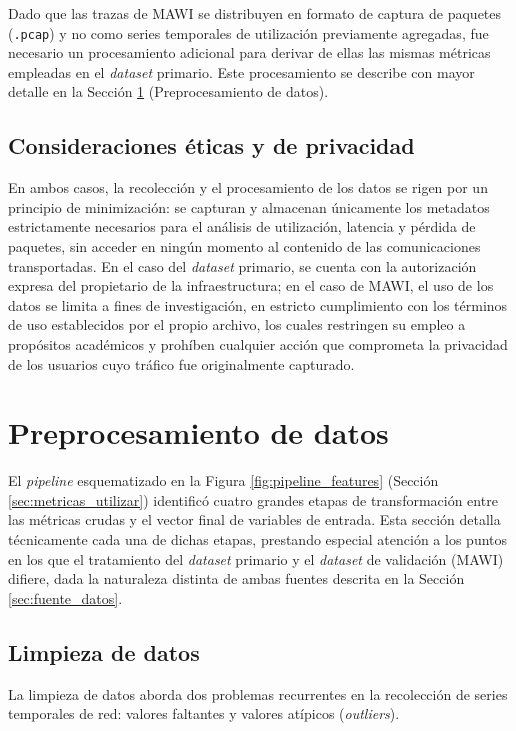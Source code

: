 \documentclass[12pt]{report}
\begin{document}
Dado que las trazas de MAWI se distribuyen en formato de captura de paquetes (\texttt{.pcap}) y no como series temporales de utilización previamente agregadas, fue necesario un procesamiento adicional para derivar de ellas las mismas métricas empleadas en el \textit{dataset} primario. Este procesamiento se describe con mayor detalle en la Sección \ref{sec:preprocesamiento} (Preprocesamiento de datos).

\subsection*{Consideraciones éticas y de privacidad}

En ambos casos, la recolección y el procesamiento de los datos se rigen por un principio de minimización: se capturan y almacenan únicamente los metadatos estrictamente necesarios para el análisis de utilización, latencia y pérdida de paquetes, sin acceder en ningún momento al contenido de las comunicaciones transportadas. En el caso del \textit{dataset} primario, se cuenta con la autorización expresa del propietario de la infraestructura; en el caso de MAWI, el uso de los datos se limita a fines de investigación, en estricto cumplimiento con los 
términos de uso establecidos por el propio archivo, los cuales restringen su empleo a propósitos académicos y prohíben cualquier acción que comprometa la privacidad de los usuarios cuyo tráfico fue originalmente capturado.

\section{Preprocesamiento de datos}
\label{sec:preprocesamiento}

El \textit{pipeline} esquematizado en la Figura \ref{fig:pipeline_features} (Sección \ref{sec:metricas_utilizar}) identificó cuatro grandes etapas de transformación entre las métricas crudas y el vector final de variables de entrada. Esta sección detalla técnicamente cada una de dichas etapas, prestando especial atención a los puntos en los que el tratamiento del \textit{dataset} primario y el \textit{dataset} de validación (MAWI) difiere, dada la naturaleza distinta de ambas fuentes descrita en la Sección \ref{sec:fuente_datos}.

\subsection*{Limpieza de datos}

La limpieza de datos aborda dos problemas recurrentes en la recolección de series temporales de red: valores faltantes y valores atípicos (\textit{outliers}).
\end{document}

